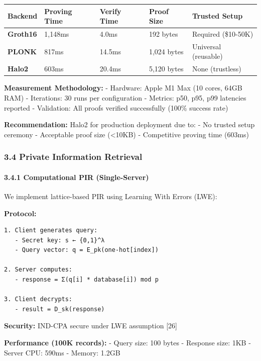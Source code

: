 \documentclass[
  11pt,
]{article}
\begin{document}
\begin{longtable}[]{@{}lllll@{}}
\toprule\noalign{}
Backend & Proving Time & Verify Time & Proof Size & Trusted Setup \\
\midrule\noalign{}
\endhead
\bottomrule\noalign{}
\endlastfoot
\textbf{Groth16} & 1,148ms & 4.0ms & 192 bytes & Required (\$10-50K) \\
\textbf{PLONK} & 817ms & 14.5ms & 1,024 bytes & Universal (reusable) \\
\textbf{Halo2} & 603ms & 20.4ms & 5,120 bytes & None (trustless) \\
\end{longtable}

\textbf{Measurement Methodology:} - Hardware: Apple M1 Max (10 cores,
64GB RAM) - Iterations: 30 runs per configuration - Metrics: p50, p95,
p99 latencies reported - Validation: All proofs verified successfully
(100\% success rate)

\textbf{Recommendation:} Halo2 for production deployment due to: - No
trusted setup ceremony - Acceptable proof size (\textless10KB) -
Competitive proving time (603ms)

\subsubsection{3.4 Private Information
Retrieval}\label{private-information-retrieval}

\paragraph{3.4.1 Computational PIR
(Single-Server)}\label{computational-pir-single-server}

We implement lattice-based PIR using Learning With Errors (LWE):

\textbf{Protocol:}

\begin{verbatim}
1. Client generates query:
   - Secret key: s ← {0,1}^λ
   - Query vector: q = E_pk(one-hot[index])

2. Server computes:
   - response = Σ(q[i] * database[i]) mod p

3. Client decrypts:
   - result = D_sk(response)
\end{verbatim}

\textbf{Security:} IND-CPA secure under LWE assumption {[}26{]}

\textbf{Performance (100K records):} - Query size: 100 bytes - Response
size: 1KB - Server CPU: 590ms - Memory: 1.2GB
\end{document}
